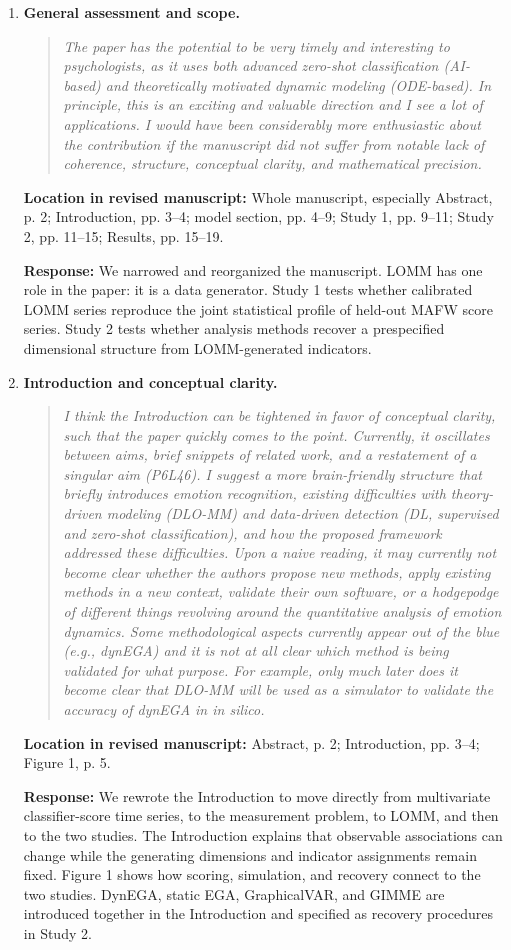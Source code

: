 \documentclass[11pt]{article}
\newenvironment{reviewquote}{\begin{quote}\small\itshape}{\end{quote}}
\newcommand{\point}[1]{\textbf{#1.}}
\newcommand{\location}[1]{\textbf{Location in revised manuscript:} #1\par}
\newcommand{\response}{\textbf{Response:} }
\begin{document}
\begin{enumerate}
  \item \point{General assessment and scope}
  \begin{reviewquote}
  The paper has the potential to be very timely and interesting to psychologists, as it uses both advanced zero-shot classification (AI-based) and theoretically motivated dynamic modeling (ODE-based). In principle, this is an exciting and valuable direction and I see a lot of applications. I would have been considerably more enthusiastic about the contribution if the manuscript did not suffer from notable lack of coherence, structure, conceptual clarity, and mathematical precision.
  \end{reviewquote}
  \location{Whole manuscript, especially Abstract, p. 2; Introduction, pp. 3--4; model section, pp. 4--9; Study 1, pp. 9--11; Study 2, pp. 11--15; Results, pp. 15--19.}
  \response We narrowed and reorganized the manuscript. LOMM has one role in the paper: it is a data generator. Study 1 tests whether calibrated LOMM series reproduce the joint statistical profile of held-out MAFW score series. Study 2 tests whether analysis methods recover a prespecified dimensional structure from LOMM-generated indicators.

  \item \point{Introduction and conceptual clarity}
  \begin{reviewquote}
  I think the Introduction can be tightened in favor of conceptual clarity, such that the paper quickly comes to the point. Currently, it oscillates between aims, brief snippets of related work, and a restatement of a singular aim (P6L46). I suggest a more brain-friendly structure that briefly introduces emotion recognition, existing difficulties with theory-driven modeling (DLO-MM) and data-driven detection (DL, supervised and zero-shot classification), and how the proposed framework addressed these difficulties. Upon a naive reading, it may currently not become clear whether the authors propose new methods, apply existing methods in a new context, validate their own software, or a hodgepodge of different things revolving around the quantitative analysis of emotion dynamics. Some methodological aspects currently appear out of the blue (e.g., dynEGA) and it is not at all clear which method is being validated for what purpose. For example, only much later does it become clear that DLO-MM will be used as a simulator to validate the accuracy of dynEGA in in silico.
  \end{reviewquote}
  \location{Abstract, p. 2; Introduction, pp. 3--4; Figure 1, p. 5.}
  \response We rewrote the Introduction to move directly from multivariate classifier-score time series, to the measurement problem, to LOMM, and then to the two studies. The Introduction explains that observable associations can change while the generating dimensions and indicator assignments remain fixed. Figure 1 shows how scoring, simulation, and recovery connect to the two studies. DynEGA, static EGA, GraphicalVAR, and GIMME are introduced together in the Introduction and specified as recovery procedures in Study 2.


\end{enumerate}
\end{document}
